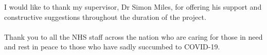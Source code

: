 I would like to thank my supervisor, Dr Simon Miles, for offering his support and constructive suggestions throughout the duration of the project.\par
\paragraph{}
Thank you to all the NHS staff across the nation who are caring for those in need and rest in peace to those who have sadly succumbed to COVID-19.